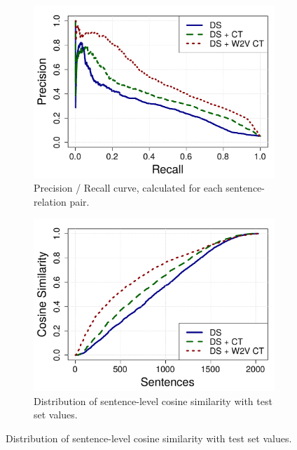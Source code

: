 \begin{figure}[tbh!]
\centering
\begin{subfigure}{.5\textwidth}
\caption{Precision / Recall curve, calculated for each sentence-relation pair.}
\label{fig:pr}
\includegraphics[width=\linewidth]{img/pr.pdf}
\end{subfigure}%
\begin{subfigure}{.5\textwidth}
\caption{Distribution of sentence-level cosine similarity with test set values.}
\label{fig:cos_sim}
\includegraphics[width=\linewidth]{img/cos_sim.pdf}
\end{subfigure}
\end{figure}

